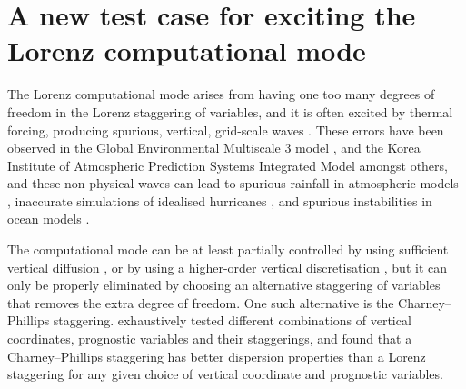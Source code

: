 \chapter{A new test case for exciting the Lorenz computational mode}
\label{ch:cp}

The Lorenz computational mode arises from having one too many degrees of freedom in the Lorenz staggering of variables, and it is often excited by thermal forcing, producing spurious, vertical, grid-scale waves \citep{schneider1987,arakawa-konor1996}.
These errors have been observed in the Global Environmental Multiscale 3 model \citep{girard2014}, and the Korea Institute of Atmospheric Prediction Systems Integrated Model \citep{yi-park2017} amongst others, and these non-physical waves can lead to spurious rainfall in atmospheric models \citep{hollingsworth1995}, inaccurate simulations of idealised hurricanes \citep{zhu-smith2003}, and spurious instabilities in ocean models \citep{bell-white2017}.

The computational mode can be at least partially controlled by using sufficient vertical diffusion \citep{chang1992,zadra2004}, or by using a higher-order vertical discretisation \citep{untch-hortal2004,guerra-ullrich2016,yi-park2017}, but it can only be properly eliminated by choosing an alternative staggering of variables that removes the extra degree of freedom.
One such alternative is the Charney--Phillips staggering.  \citet{thuburn-woolings2005} exhaustively tested different combinations of vertical coordinates, prognostic variables and their staggerings, and found that a Charney--Phillips staggering has better dispersion properties than a Lorenz staggering for any given choice of vertical coordinate and prognostic variables.



